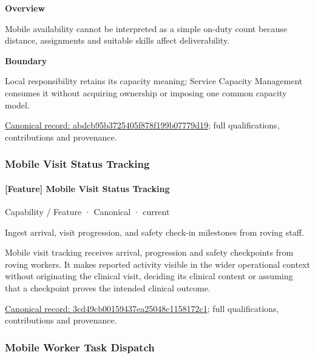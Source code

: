 \textbf{Overview}



Mobile availability cannot be interpreted as a simple on-duty count because distance, assignments and suitable skills affect deliverability.



\textbf{Boundary}



Local responsibility retains its capacity meaning; Service Capacity Management consumes it without acquiring ownership or imposing one common capacity model.


{\footnotesize \href{../../../../continuum/strategy/capability/feature/abdcb95b3725405f878f199b07779d19.md}{Canonical record: abdcb95b3725405f878f199b07779d19}; full qualifications, contributions and provenance.}\par
\subsubsection{Mobile Visit Status Tracking}

\paragraph{[Feature] Mobile Visit Status Tracking}

\label{element:3cd49cb00159437ea25048c1158172c1}
{\small Capability / Feature · Canonical · current}\par

Ingest arrival, visit progression, and safety check-in milestones from roving staff.



Mobile visit tracking receives arrival, progression and safety checkpoints from roving workers. It makes reported activity visible in the wider operational context without originating the clinical visit, deciding its clinical content or assuming that a checkpoint proves the intended clinical outcome.


{\footnotesize \href{../../../../continuum/strategy/capability/feature/3cd49cb00159437ea25048c1158172c1.md}{Canonical record: 3cd49cb00159437ea25048c1158172c1}; full qualifications, contributions and provenance.}\par
\subsubsection{Mobile Worker Task Dispatch}

